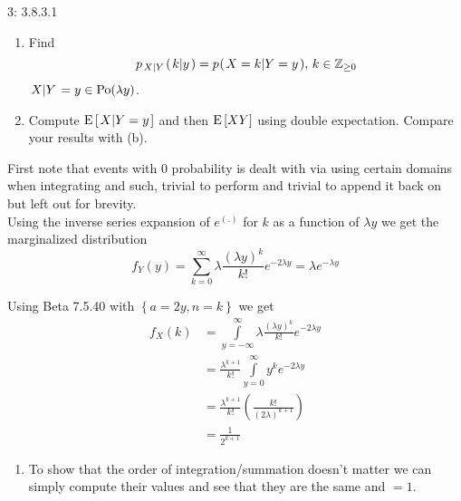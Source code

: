 \documentclass[a4paper,twoside=false,abstract=false,numbers=noenddot,
titlepage=false,headings=small,parskip=half,version=last]{scrartcl}
\begin{document}
\begin{exercise}{3: 3.8.3.1}
\begin{enumerate}
        \item Find
            \begin{equation}
                p_{\left. X \middle\vert Y \right.} (\left. k \middle\vert y \right.) =
                p_{} (\left. X=k \middle\vert Y=y \right.), \, k\in\mathbb{Z}_{\ge 0}
            \end{equation}
            \Answer $\left. X \middle\vert Y \right. = y\in\text{Po}(\lambda y)$.

        \item Compute ${\rm E}\,[\left. X \middle\vert Y=y \right.]$ and then
            ${\rm E}\,[XY]$ using double expectation.
            Compare your results with (b).

    \end{enumerate}
\end{exercise}
\begin{solution}
    First note that events with $0$ probability is dealt with via using certain domains
    when integrating and such, trivial to perform and trivial to append it back on but left out for
    brevity.\\
    Using the inverse series expansion of $e^{(.)}$ for $k$ as a
    function of $\lambda y$ we get the marginalized distribution
    \begin{equation}
        \label{eq:fY}
        f_Y(y) = \sum\limits_{k=0}^\infty
            \lambda \frac{(\lambda y)^k}{k!}e^{-2\lambda y} =
            \lambda e^{-\lambda y}
    \end{equation}

    Using Beta 7.5.40 with $\left\{a=2y, n=k\right\}$ we get
    \begin{align}
        \label{eq:fX}
        f_X(k) &= \int\limits_{y=-\infty}^\infty
            \lambda \frac{(\lambda y)^k}{k!}e^{-2\lambda y} \nonumber \\ &=
            \frac{\lambda^{k+1}}{k!} \int\limits_{y=0}^\infty y^k e^{-2\lambda
            y} \nonumber \\ &=
            \frac{\lambda^{k+1}}{k!} \left(\frac{k!}{(2\lambda)^{k+1}}\right)\nonumber \\ &=
            \frac{1}{2^{k+1}}
    \end{align}
    \begin{enumerate}
        \item To show that the order of integration/summation doesn't matter we can
            simply compute their values and see that they are the same and $=1$.


\end{enumerate}
\end{solution}
\end{document}
